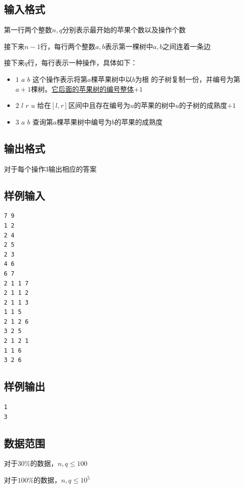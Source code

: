 \documentclass[12pt]{article}
\begin{document}
    \subsection{输入格式}
    第一行两个整数$n,q$分别表示最开始的苹果个数以及操作个数\par
    接下来$n-1$行，每行两个整数$a,b$表示第一棵树中$a,b$之间连着一条边\par
    接下来$q$行，每行表示一种操作，具体如下：\par
    \begin{itemize}
        \item $1$ $a$ $b$ 这个操作表示将第$a$棵苹果树中以$b$为根
            的子树复制一份，并编号为第$a+1$棵树。\underline{它后面的苹果树的编号整体$+1$}\par
        \item $2$ $l$ $r$ $u$ 给在$[l,r]$区间中且存在编号为$u$的苹果的树中$u$的子树的成熟度$+1$
        \item $3$ $a$ $b$ 查询第$a$棵苹果树中编号为$b$的苹果的成熟度
    \end{itemize}\par
    \subsection{输出格式}
    对于每个操作$3$输出相应的答案
    \subsection{样例输入}
    \begin{lstlisting}
7 9
1 2
2 4
2 5
2 3
4 6
6 7
2 1 1 7
2 1 1 2
2 1 1 3
1 1 5
2 1 2 6
3 2 5
2 1 2 1
1 1 6
3 2 6
    \end{lstlisting}
    \subsection{样例输出}
    \begin{lstlisting}
1
3
    \end{lstlisting}
    \subsection{数据范围}
    对于$30\%$的数据，$n,q\leq 100$\par
    对于$100\%$的数据，$n,q\leq 10^5$\par
\end{document}
